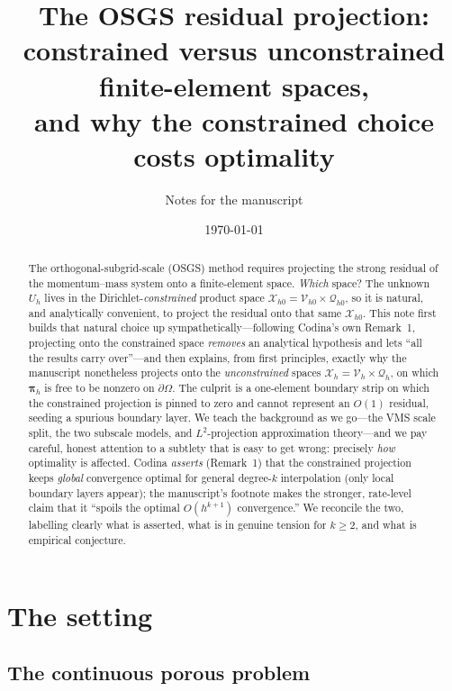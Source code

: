 \documentclass[11pt]{article}
\title{\bfseries The OSGS residual projection:\\
constrained versus unconstrained finite-element spaces,\\
and why the constrained choice costs optimality}
\author{Notes for the manuscript}
\date{\today}
\newcommand{\bpi}{\boldsymbol{\pi}}
\newcommand{\Xh}{\mathcal{X}_{h}}
\newcommand{\Xhz}{\mathcal{X}_{h0}}
\newcommand{\Vh}{\mathcal{V}_{h}}
\newcommand{\Vhz}{\mathcal{V}_{h0}}
\newcommand{\Qh}{\mathcal{Q}_{h}}
\newcommand{\Qhz}{\mathcal{Q}_{h0}}
\newcommand{\Uh}{U_{h}}
\theoremstyle{plain}
\theoremstyle{definition}
\theoremstyle{remark}
\begin{document}
\maketitle

\begin{abstract}
The orthogonal-subgrid-scale (OSGS) method requires projecting the
strong residual of the momentum--mass system onto a finite-element
space. \emph{Which} space? The unknown $\Uh$ lives in the
Dirichlet-\emph{constrained} product space $\Xhz=\Vhz\times\Qhz$, so it
is natural, and analytically convenient, to project the residual onto
that same $\Xhz$. This note first builds that natural choice up
sympathetically---following Codina's own Remark~1, projecting onto the
constrained space \emph{removes} an analytical hypothesis and lets
``all the results carry over''---and then explains, from first
principles, exactly why the manuscript nonetheless projects onto the
\emph{unconstrained} spaces $\Xh=\Vh\times\Qh$, on which
$\bpi_h$ is free to be nonzero on $\partial\Omega$. The culprit is a
one-element boundary strip on which the constrained projection is
pinned to zero and cannot represent an $O(1)$ residual, seeding a
spurious boundary layer. We teach the background as we go---the VMS
scale split, the two subscale models, and $L^2$-projection
approximation theory---and we pay careful, honest attention to a
subtlety that is easy to get wrong: precisely \emph{how} optimality is
affected. Codina \emph{asserts} (Remark~1) that the constrained projection
keeps \emph{global} convergence optimal for general degree-$k$ interpolation
(only local boundary layers appear); the manuscript's footnote makes the
stronger, rate-level claim that it ``spoils the optimal $O(h^{k+1})$
convergence.'' We reconcile the two, labelling clearly what is asserted, what
is in genuine tension for $k\ge2$, and what is empirical conjecture.
\end{abstract}

\tableofcontents

\section{The setting}

\subsection{The continuous porous problem}
\end{document}
